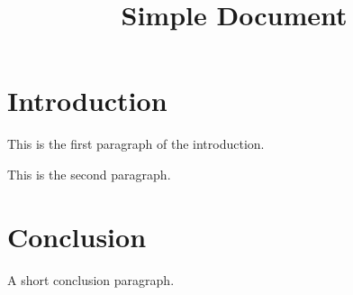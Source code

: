 \documentclass{article}
\title{Simple Document}
\begin{document}
\maketitle

\section{Introduction}

This is the first paragraph of the introduction.

This is the second paragraph.

\section{Conclusion}

A short conclusion paragraph.
\end{document}
